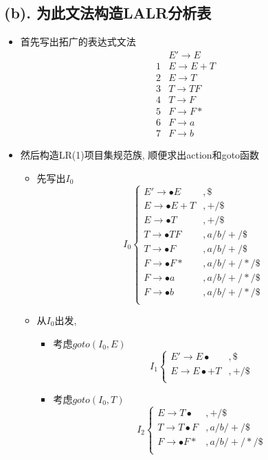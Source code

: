 \documentclass[UTF8]{article}
\newcommand{\blt}{\bullet}
\begin{document}
\subsection*{(b). 为此文法构造LALR分析表}
\begin{itemize}
\item 首先写出拓广的表达式文法
$$\begin{array}{ll}
 & E'\rightarrow E\\
1 & E\rightarrow E+T\\
2 & E\rightarrow T\\
3 & T\rightarrow TF\\
4 & T\rightarrow F\\
5 & F\rightarrow F*\\
6 & F\rightarrow a\\
7 & F\rightarrow b
\end{array}$$
\item 然后构造LR(1)项目集规范族, 顺便求出action和goto函数
	\begin{itemize}
	\item 先写出$I_0$
	$$I_0\left\{\begin{array}{ll}
	E'\rightarrow \blt E & ,\$\\
	E\rightarrow \blt E+T & ,+/\$\\
	E\rightarrow\blt T & ,+/\$\\
	T\rightarrow\blt TF & ,a/b/+/\$\\
	T\rightarrow\blt F & , a/b/+/\$\\
	F\rightarrow\blt F* & , a/b/+/*/\$\\
	F\rightarrow\blt a & ,a/b/+/*/\$\\
	F\rightarrow\blt b & ,a/b/+/*/\$\\
	\end{array}\right.$$
	\item 从$I_0$出发,
		\begin{itemize}
		\item 考虑$goto(I_0,E)$
			$$I_1\left\{\begin{array}{ll}
			E'\rightarrow E\blt & ,\$\\
			E\rightarrow  E\blt+T & ,+/\$\\
			\end{array}\right.$$
		\item 考虑$goto(I_0,T)$
			$$I_2\left\{\begin{array}{ll}
			E\rightarrow T\blt & ,+/\$\\
			T\rightarrow T\blt F & ,a/b/+/\$\\
			F\rightarrow\blt F* & , a/b/+/*/\$\\

\end{array}$$
\end{itemize}
\end{itemize}
\end{itemize}
\end{document}
